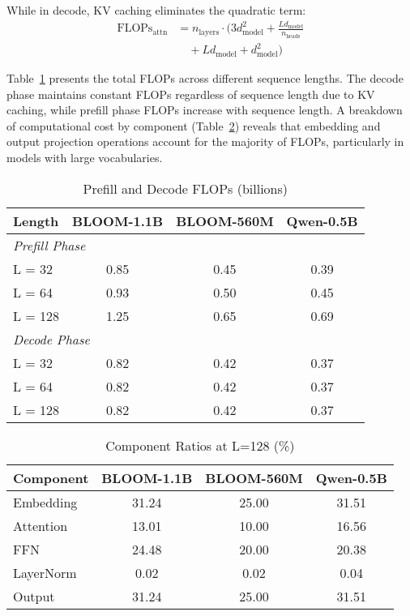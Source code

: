 While in decode, KV caching eliminates the quadratic term:
\begin{align}
    \text{FLOPs}_{\text{attn}} &= n_{\text{layers}} \cdot \Big(3d_{\text{model}}^2 + \frac{L d_{\text{model}}}{n_{\text{heads}}} \nonumber \\
    &\quad+ L d_{\text{model}} + d_{\text{model}}^2\Big)
\end{align}

Table~\ref{tab:prefill-decode} presents the total FLOPs across different sequence lengths. The decode phase maintains constant FLOPs regardless of sequence length due to KV caching, while prefill phase FLOPs increase with sequence length. A breakdown of computational cost by component (Table~\ref{tab:components}) reveals that embedding and output projection operations account for the majority of FLOPs, particularly in models with large vocabularies.

\begin{table}[t]
    \centering
    \footnotesize
    \begin{tabularx}{\linewidth}{lccc}
    \toprule
    \textbf{Length} & \textbf{BLOOM-1.1B} & \textbf{BLOOM-560M} & \textbf{Qwen-0.5B} \\
    \midrule
    \multicolumn{4}{l}{\textit{Prefill Phase}} \\
    L = 32 & 0.85 & 0.45 & 0.39 \\
    L = 64 & 0.93 & 0.50 & 0.45 \\
    L = 128 & 1.25 & 0.65 & 0.69 \\
    \midrule
    \multicolumn{4}{l}{\textit{Decode Phase}} \\
    L = 32 & 0.82 & 0.42 & 0.37 \\
    L = 64 & 0.82 & 0.42 & 0.37 \\
    L = 128 & 0.82 & 0.42 & 0.37 \\
    \bottomrule
    \end{tabularx}
    \caption{Prefill and Decode FLOPs (billions)}
    \vskip -0.1in
    \label{tab:prefill-decode}
\end{table}

\begin{table}[t]
    \centering
    \footnotesize
    \begin{tabularx}{\linewidth}{lccc}
    \toprule
    \textbf{Component} & \textbf{BLOOM-1.1B} & \textbf{BLOOM-560M} & \textbf{Qwen-0.5B} \\
    \midrule
    Embedding & 31.24 & 25.00 & 31.51 \\
    Attention & 13.01 & 10.00 & 16.56 \\
    FFN & 24.48 & 20.00 & 20.38 \\
    LayerNorm & 0.02 & 0.02 & 0.04 \\
    Output & 31.24 & 25.00 & 31.51 \\
    \bottomrule
    \end{tabularx}
    \caption{Component Ratios at L=128 (\%)}
    \vskip -0.1in
    \label{tab:components}
\end{table}

